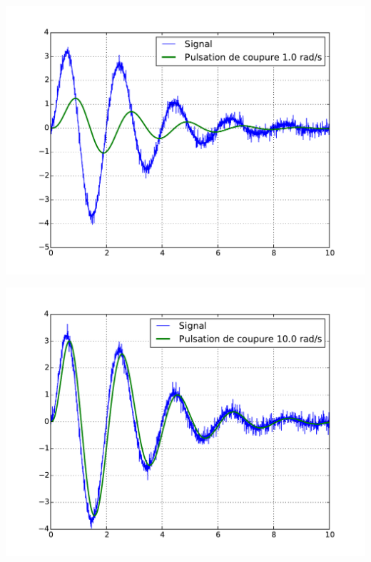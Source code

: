 \documentclass[10pt,fleqn]{article} %
\begin{document}
\begin{minipage}[c]{.43\linewidth}
\begin{center}
\includegraphics[width=\textwidth]{images/ordre1_1}
\end{center}
\end{minipage} \hfill
\begin{minipage}[c]{.43\linewidth}
\begin{center}
\includegraphics[width=\textwidth]{images/ordre1_2}
\end{center}
\end{minipage} 
\end{document}
